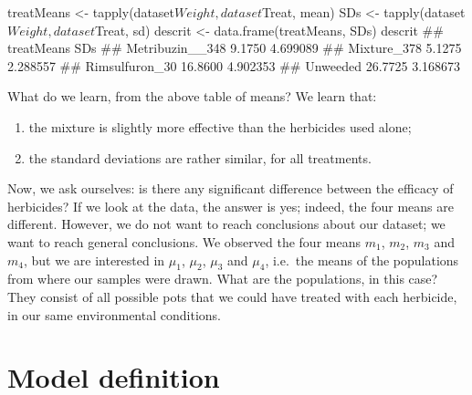 \documentclass[a4paper,12pt,oneside]{book}
\providecommand{\tightlist}{%
  \setlength{\itemsep}{0pt}\setlength{\parskip}{0pt}}
\newenvironment{Shaded}{\begin{snugshade}}{\end{snugshade}}
\newcommand{\SpecialCharTok}[1]{#1}
\newcommand{\DocumentationTok}[1]{#1}
\newcommand{\OtherTok}[1]{#1}
\newcommand{\FunctionTok}[1]{#1}
\newcommand{\NormalTok}[1]{#1}
\begin{document}
\vspace{12pt}

\begin{Shaded}
\begin{Highlighting}[]
\NormalTok{treatMeans }\OtherTok{\textless{}{-}} \FunctionTok{tapply}\NormalTok{(dataset}\SpecialCharTok{$}\NormalTok{Weight, dataset}\SpecialCharTok{$}\NormalTok{Treat, mean)}
\NormalTok{SDs }\OtherTok{\textless{}{-}} \FunctionTok{tapply}\NormalTok{(dataset}\SpecialCharTok{$}\NormalTok{Weight, dataset}\SpecialCharTok{$}\NormalTok{Treat, sd)}
\NormalTok{descrit }\OtherTok{\textless{}{-}} \FunctionTok{data.frame}\NormalTok{(treatMeans, SDs)}
\NormalTok{descrit}
\DocumentationTok{\#\#                 treatMeans      SDs}
\DocumentationTok{\#\# Metribuzin\_\_348     9.1750 4.699089}
\DocumentationTok{\#\# Mixture\_378         5.1275 2.288557}
\DocumentationTok{\#\# Rimsulfuron\_30     16.8600 4.902353}
\DocumentationTok{\#\# Unweeded           26.7725 3.168673}
\end{Highlighting}
\end{Shaded}

What do we learn, from the above table of means? We learn that:

\begin{enumerate}
\def\labelenumi{\arabic{enumi}.}
\tightlist
\item
  the mixture is slightly more effective than the herbicides used alone;
\item
  the standard deviations are rather similar, for all treatments.
\end{enumerate}

Now, we ask ourselves: is there any significant difference between the efficacy of herbicides? If we look at the data, the answer is yes; indeed, the four means are different. However, we do not want to reach conclusions about our dataset; we want to reach general conclusions. We observed the four means \(m_1\), \(m_2\), \(m_3\) and \(m_4\), but we are interested in \(\mu_1\), \(\mu_2\), \(\mu_3\) and \(\mu_4\), i.e.~the means of the populations from where our samples were drawn. What are the populations, in this case? They consist of all possible pots that we could have treated with each herbicide, in our same environmental conditions.

\hypertarget{model-definition}{%
\section{Model definition}\label{model-definition}}
\end{document}
